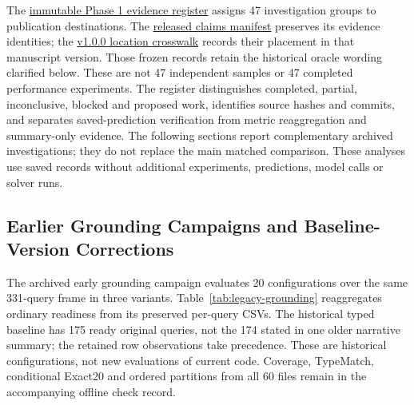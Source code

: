 The \href{https://github.com/SoroushVahidi/combinatorial-opt-agent/blob/a09032a23c4c44a5d6d2a5215b3a8c1ca3b1a650/docs/jdsa_revision_phase1_20261029/EXPERIMENT_EVIDENCE_REGISTER.md}{immutable Phase 1 evidence register} assigns 47 investigation groups to publication destinations. The \href{https://github.com/SoroushVahidi/combinatorial-opt-agent/blob/209fa982c0a0e2087bd021cbc7a9f57d94256c8f/reproducibility/jdsa-v2.0.0/claims.json}{released claims manifest} preserves its evidence identities; the \href{https://github.com/SoroushVahidi/combinatorial-opt-agent/blob/00adeca9d3d761da7f8ee2e5dcee7fc8d535f2bc/docs/jdsa_manuscript_v1_20261029/CLAIM_LOCATION_CROSSWALK_V1.md}{v1.0.0 location crosswalk} records their placement in that manuscript version. Those frozen records retain the historical oracle wording clarified below. These are not 47 independent samples or 47 completed performance experiments. The register distinguishes completed, partial, inconclusive, blocked and proposed work, identifies source hashes and commits, and separates saved-prediction verification from metric reaggregation and summary-only evidence. The following sections report complementary archived investigations; they do not replace the main matched comparison. These analyses use saved records without additional experiments, predictions, model calls or solver runs.

\subsection{Earlier Grounding Campaigns and Baseline-Version Corrections}
The archived early grounding campaign evaluates 20 configurations over the same 331-query frame in three variants. Table~\ref{tab:legacy-grounding} reaggregates ordinary readiness from its preserved per-query CSVs. The historical typed baseline has 175 ready original queries, not the 174 stated in one older narrative summary; the retained row observations take precedence. These are historical configurations, not new evaluations of current code. Coverage, TypeMatch, conditional Exact20 and ordered partitions from all 60 files remain in the accompanying offline check record.

